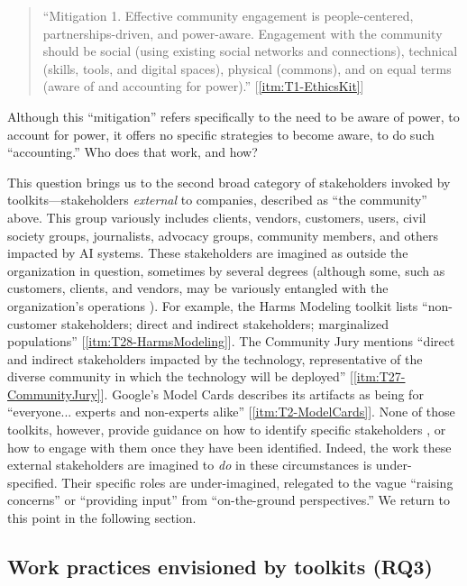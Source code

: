 \documentclass[acmsmall]{acmart}
\begin{document}
\begin{quote}
    ``Mitigation 1. Effective community engagement is people-centered, partnerships-driven, and power-aware. Engagement with the community should be social (using existing social networks and connections), technical (skills, tools, and digital spaces), physical (commons), and on equal terms (aware of and accounting for power).''
    [\ref{itm:T1-EthicsKit}]
\end{quote}

Although this ``mitigation'' refers specifically to the need to be aware of power, to account for power, it offers no specific strategies to become aware, to do such ``accounting.'' Who does that work, and how? 


This question brings us to the second broad category of stakeholders invoked by toolkits---stakeholders \textit{external} to companies, described as ``the community'' above. This group variously includes
clients, vendors, customers, users, civil society groups, journalists, advocacy groups, community members, and others impacted by AI systems. These stakeholders are imagined as outside the organization in question,
sometimes by several degrees (although some, such as customers, clients, and vendors, may be variously entangled with the organization's operations \cite[cf.][]{gray2019ghost}). For example, the Harms Modeling toolkit lists ``non-customer stakeholders; direct and indirect stakeholders; marginalized populations'' [\ref{itm:T28-HarmsModeling}].
The Community Jury mentions ``direct and indirect stakeholders impacted by the technology, representative of the diverse community in which the technology will be deployed'' [\ref{itm:T27-CommunityJury}].
Google's Model Cards describes its artifacts as being for ``everyone... experts and non-experts alike'' [\ref{itm:T2-ModelCards}].
None of those toolkits, however, provide guidance on how to identify specific stakeholders \cite[cf.][]{madaio2022assessing}, or how to engage with them once they have been identified.
Indeed, the work these external stakeholders are imagined to \emph{do} in these circumstances is under-specified. Their specific roles are under-imagined, relegated to the vague ``raising concerns'' or ``providing input'' from ``on-the-ground perspectives.'' We return to this point in the following section.

\subsection{Work practices envisioned by toolkits (RQ3)}
\end{document}
